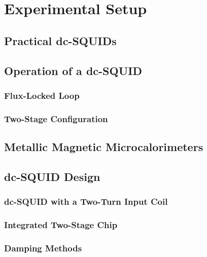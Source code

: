 \chapter{Experimental Setup}

\section{Practical dc-SQUIDs}\label{sec_practical_SQUID}

\section{Operation of a dc-SQUID}

\subsection{Flux-Locked Loop}

\subsection{Two-Stage Configuration}

\section{Metallic Magnetic Microcalorimeters} 

\section{dc-SQUID Design}

\subsection{dc-SQUID with a Two-Turn Input Coil}

\subsection{Integrated Two-Stage Chip}

\subsection{Damping Methods}